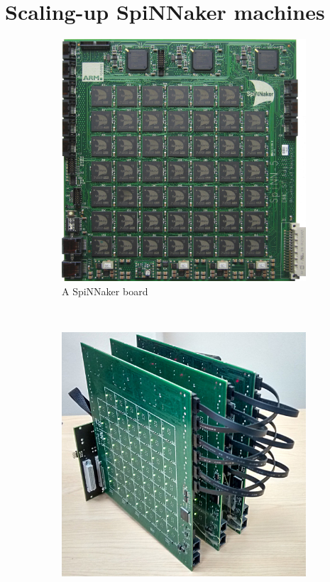 	\section{Scaling-up SpiNNaker machines}
		
		\begin{figure}
			\center
			\begin{subfigure}[b]{0.45\linewidth}
				\center
				\includegraphics[width=\linewidth]{figures/spinnakerBoard.jpg}
				
				\caption{A SpiNNaker board}
				\label{fig:spinnakerBoard}
			\end{subfigure}
			~~~
			\begin{subfigure}[b]{0.45\linewidth}
				\center
				\includegraphics[width=\linewidth]{figures/threeboard.jpg}
				

\end{subfigure}
\end{figure}
